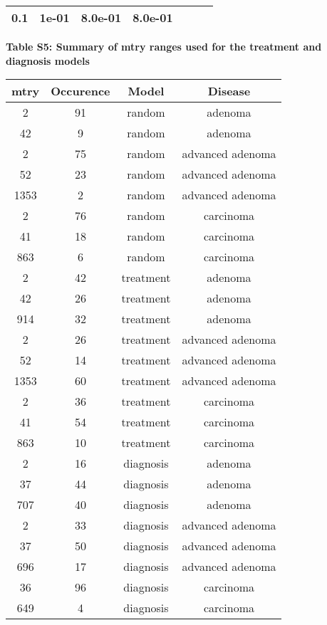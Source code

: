 \documentclass[12pt,]{article}
\begin{document}
\begin{longtable}[]{@{}ccccccc@{}}
\begin{minipage}[t]{0.08\columnwidth}
0.1\strut
\end{minipage} & \begin{minipage}[t]{0.10\columnwidth}\centering\strut
1e-01\strut
\end{minipage} & \begin{minipage}[t]{0.07\columnwidth}\centering\strut
8.0e-01\strut
\end{minipage} & \begin{minipage}[t]{0.09\columnwidth}\centering\strut
8.0e-01\strut
\end{minipage}\tabularnewline
\bottomrule
\end{longtable}

\newpage

\textbf{Table S5: Summary of mtry ranges used for the treatment and
diagnosis models}

\footnotesize

\begin{longtable}[]{@{}cccc@{}}
\toprule
mtry & Occurence & Model & Disease\tabularnewline
\midrule
\endhead
2 & 91 & random & adenoma\tabularnewline
42 & 9 & random & adenoma\tabularnewline
2 & 75 & random & advanced adenoma\tabularnewline
52 & 23 & random & advanced adenoma\tabularnewline
1353 & 2 & random & advanced adenoma\tabularnewline
2 & 76 & random & carcinoma\tabularnewline
41 & 18 & random & carcinoma\tabularnewline
863 & 6 & random & carcinoma\tabularnewline
2 & 42 & treatment & adenoma\tabularnewline
42 & 26 & treatment & adenoma\tabularnewline
914 & 32 & treatment & adenoma\tabularnewline
2 & 26 & treatment & advanced adenoma\tabularnewline
52 & 14 & treatment & advanced adenoma\tabularnewline
1353 & 60 & treatment & advanced adenoma\tabularnewline
2 & 36 & treatment & carcinoma\tabularnewline
41 & 54 & treatment & carcinoma\tabularnewline
863 & 10 & treatment & carcinoma\tabularnewline
2 & 16 & diagnosis & adenoma\tabularnewline
37 & 44 & diagnosis & adenoma\tabularnewline
707 & 40 & diagnosis & adenoma\tabularnewline
2 & 33 & diagnosis & advanced adenoma\tabularnewline
37 & 50 & diagnosis & advanced adenoma\tabularnewline
696 & 17 & diagnosis & advanced adenoma\tabularnewline
36 & 96 & diagnosis & carcinoma\tabularnewline
649 & 4 & diagnosis & carcinoma\tabularnewline
\bottomrule
\end{longtable}

\normalsize
\end{document}
